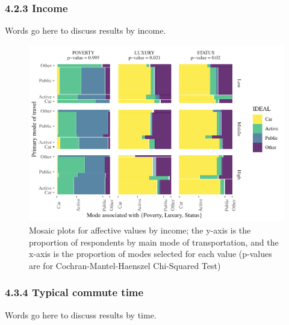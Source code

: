 \documentclass[]{elsarticle} %
\makeatletter
\def\maxwidth{\ifdim\Gin@nat@width>\linewidth\linewidth
\else\Gin@nat@width\fi}
\let\Oldincludegraphics\includegraphics
\renewcommand{\includegraphics}[1]{\Oldincludegraphics[width=\maxwidth]{#1}}
\makeatother
\begin{document}
\hypertarget{income-1}{%
\subsubsection{4.2.3 Income}\label{income-1}}

Words go here to discuss results by income.

\begin{figure}
\centering
\includegraphics{Dissonance_Santiago_v1_files/figure-latex/figure-mosaic-plots-by-attribute-and-income-1.pdf}
\caption{\label{fig:mosaic-plots-by-income}Mosaic plots for affective
values by income; the y-axis is the proportion of respondents by main
mode of transportation, and the x-axis is the proportion of modes
selected for each value (p-values are for Cochran-Mantel-Haenszel
Chi-Squared Test)}
\end{figure}

\hypertarget{typical-commute-time-1}{%
\subsubsection{4.3.4 Typical commute
time}\label{typical-commute-time-1}}

Words go here to discuss results by time.
\end{document}
